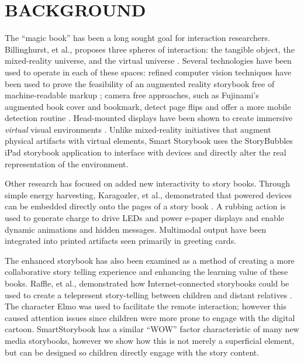 \documentclass{sigchi}
\begin{document}
\section{BACKGROUND}
The ``magic book'' has been a long sought goal for interaction researchers.
Billinghurst, et al., proposes three spheres of interaction: the tangible object, the mixed-reality universe, and the virtual universe \cite{billinghurst_magicbook-moving_2001}. Several technologies have been used to operate in each of these spaces: refined computer vision techniques have been used to prove the feasibility of an augmented reality storybook free of machine-readable markup \cite{scherrer_haunted_2008}; camera free approaches, such as Fujinami's augmented book cover and bookmark, detect page flips and offer a more mobile detection routine \cite{fujinami_page-flipping_2009}. Head-mounted displays have been shown to create immersive \textit{virtual} visual environments \cite{saso_little_2003}. Unlike mixed-reality initiatives that augment physical artifacts with virtual elements, Smart Storybook uses the StoryBubbles iPad storybook application to interface with devices and directly alter the real representation of the environment.

Other research has focused on added new interactivity to story books. 
Through simple energy harvesting, Karagozler, et al., demonstrated that powered devices can be embedded directly onto the pages of a story book \cite{karagozler_paper_2013}. A rubbing action is used to generate charge to drive LEDs and power e-paper displays and enable dynamic animations and hidden messages. 
Multimodal output have been integrated into printed artifacts \cite{iggulden_printed_1999} seen primarily in greeting cards. 

The enhanced storybook has also been examined as a method of creating a more collaborative story telling experience and enhancing the learning value of these books. Raffle, et al., demonstrated how Internet-connected storybooks could be used to create a telepresent story-telling between children and distant relatives \cite{raffle_family_2010}. The character Elmo was used to facilitate the remote interaction; however this caused attention issues since children were more prone to engage with the digital cartoon. SmartStorybook has a similar ``WOW'' factor characteristic of many new media storybooks, however we show how this is not merely a superficial element, but can be designed so children directly engage with the story content. 


\end{document}
